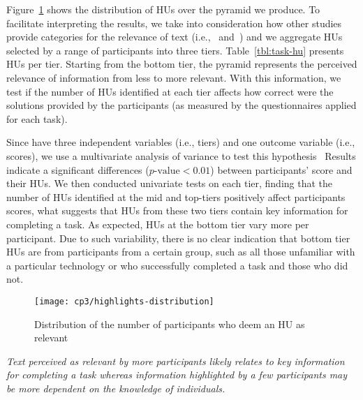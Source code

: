 Figure~\ref{fig:highlights-distribution} shows the distribution of HUs over the pyramid we produce.
To facilitate interpreting the results,
we take into consideration how other studies provide categories for the relevance of
text (i.e.,~\cite{Petrosyan2015} and~\cite{Jiang2017}) and 
we aggregate HUs selected by a range of participants into three tiers.
Table~\ref{tbl:task-hu} presents HUs per tier.
Starting from the bottom tier, the pyramid represents the perceived relevance of information from less to more relevant.
With this information, we test if the number of HUs identified at each tier affects how correct were the solutions provided by the participants (as measured by the questionnaires applied for each task). 


Since have three independent variables (i.e., tiers) and one outcome variable (i.e., scores),
we use a multivariate analysis of variance to test this hypothesis~\cite{wohlin2012} 
Results indicate a significant differences ($p\text{-value} < 0.01$) between participants' score and their HUs.
We then conducted univariate tests on each tier,
finding that 
the number of HUs identified at the mid and top-tiers 
positively affect participants scores, 
what suggests that HUs from these two tiers contain key
information for completing a task.
As expected, HUs at the bottom tier vary more per participant.
Due to such variability, there is no clear indication
that bottom tier HUs are from participants from a certain group, such as all those
unfamiliar with a particular technology or  who successfully
completed a task and those who did not.






\begin{figure}
    \centering
    \texttt{[image: cp3/highlights-distribution]}
    \caption{Distribution of the number of participants who deem an HU as relevant}
    \label{fig:highlights-distribution}
\end{figure}








\medskip
\begin{bluequote}
    \textit{Text perceived as relevant by more participants likely relates
    to key information for completing a task whereas information
    highlighted by a few participants may be more dependent on the knowledge of individuals.}
\end{bluequote}
